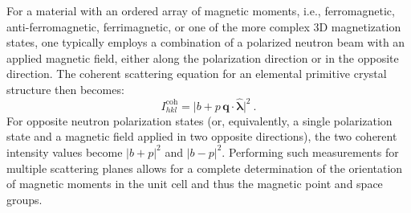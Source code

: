 For a material with an ordered array of magnetic moments, i.e., ferromagnetic, anti-ferromagnetic, ferrimagnetic, or one of the more complex 3D magnetization states, one typically employs a combination of a polarized neutron beam with an applied magnetic field, either along the polarization direction or in the opposite direction. The coherent scattering equation for an elemental primitive crystal structure then becomes:
\begin{equation}
	I^{\text{coh}}_{hkl} = \vert b + p\,\mathbf{q}\cdot\hat{\bm{\lambda}}\vert^2\ .
\end{equation}
For opposite neutron polarization states (or, equivalently, a single polarization state and a magnetic field applied in two opposite directions), the two coherent intensity values become $\vert b+p\vert^2$ and $\vert b-p\vert^2$. Performing such measurements for multiple scattering planes allows for a complete determination of the  orientation of magnetic moments in the  unit cell and thus the magnetic point and space groups.






